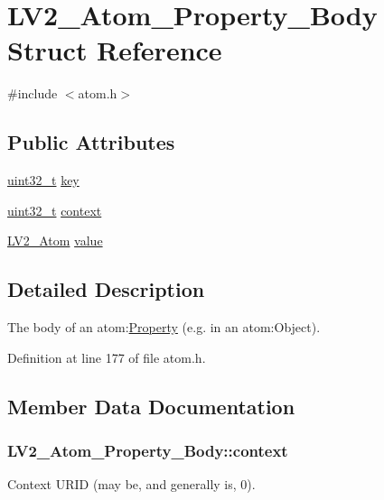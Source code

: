 \hypertarget{struct_l_v2___atom___property___body}{}\section{L\+V2\+\_\+\+Atom\+\_\+\+Property\+\_\+\+Body Struct Reference}
\label{struct_l_v2___atom___property___body}


{\ttfamily \#include $<$atom.\+h$>$}

\subsection*{Public Attributes}
\begin{DoxyCompactItemize}
\item 
\hyperlink{lib-src_2ffmpeg_2win32_2stdint_8h_a6eb1e68cc391dd753bc8ce896dbb8315}{uint32\+\_\+t} \hyperlink{struct_l_v2___atom___property___body_ac9fd00fcf59a6e0a1f09d27f0ff9b6cf}{key}
\item 
\hyperlink{lib-src_2ffmpeg_2win32_2stdint_8h_a6eb1e68cc391dd753bc8ce896dbb8315}{uint32\+\_\+t} \hyperlink{struct_l_v2___atom___property___body_adadc77803ea5c281be279836b388af9d}{context}
\item 
\hyperlink{struct_l_v2___atom}{L\+V2\+\_\+\+Atom} \hyperlink{struct_l_v2___atom___property___body_ab7eda1204d1ebad5d7134636ab7b2991}{value}
\end{DoxyCompactItemize}


\subsection{Detailed Description}
The body of an atom\+:\hyperlink{struct_property}{Property} (e.\+g. in an atom\+:Object). 

Definition at line 177 of file atom.\+h.



\subsection{Member Data Documentation}
\subsubsection[{\texorpdfstring{context}{context}}]{ L\+V2\+\_\+\+Atom\+\_\+\+Property\+\_\+\+Body\+::context}\hypertarget{struct_l_v2___atom___property___body_adadc77803ea5c281be279836b388af9d}{}\label{struct_l_v2___atom___property___body_adadc77803ea5c281be279836b388af9d}
Context U\+R\+ID (may be, and generally is, 0). 

